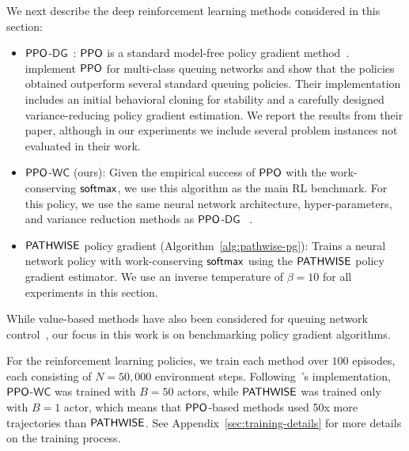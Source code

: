 We next describe the deep reinforcement learning methods considered in this section:
\begin{itemize}[itemsep=0pt]
    \item $\mathsf{PPO}$-$\mathsf{DG}$~\cite{dai2022queueing}: $\mathsf{PPO}$ is a standard model-free policy gradient method~\cite{schulman2017proximal, huang2022implementation}. ~\citet{dai2022queueing} implement $\mathsf{PPO}$ for multi-class queuing networks and show that the policies obtained outperform several standard queuing policies. 
    Their implementation includes an initial behavioral cloning for stability and a carefully designed variance-reducing policy gradient estimation. We report the results from their paper, although in our experiments we include several problem instances not evaluated in their work.
    \item $\mathsf{PPO}$-$\mathsf{WC}$ (ours): Given the empirical success of $\mathsf{PPO}$ with the work-conserving $\mathop{\mathsf{softmax}}$, we use this algorithm as the main RL benchmark. For this policy, we use the same neural network architecture, hyper-parameters, and variance reduction methods as $\mathsf{PPO}$-$\mathsf{DG}$ ~\cite{dai2022queueing}.
    \item $\mathsf{PATHWISE}$ policy gradient (Algorithm~\ref{alg:pathwise-pg}): Trains a neural network policy with work-conserving $\mathop{\mathsf{softmax}}$ using the $\mathsf{PATHWISE}$ policy  gradient estimator. We use an inverse temperature of $\beta = 10$ for all experiments in this section.
\end{itemize}
While value-based methods have also been considered for queuing network control~\cite{liu2022rl,wei2024sample}, our focus in this work is on benchmarking policy gradient algorithms. 

For the reinforcement learning policies, we train each method over $100$ episodes, each consisting of $N = 50,000$ environment steps. Following~\citet{dai2022queueing}'s implementation, $\mathsf{PPO}$-$\mathsf{WC}$ was trained with $B = 50$ actors, while $\mathsf{PATHWISE}$ was trained only with $B = 1$ actor, which means that $\mathsf{PPO}$-based methods used 50x more trajectories than $\mathsf{PATHWISE}$. See Appendix~\ref{sec:training-details} for more details on the training process.






